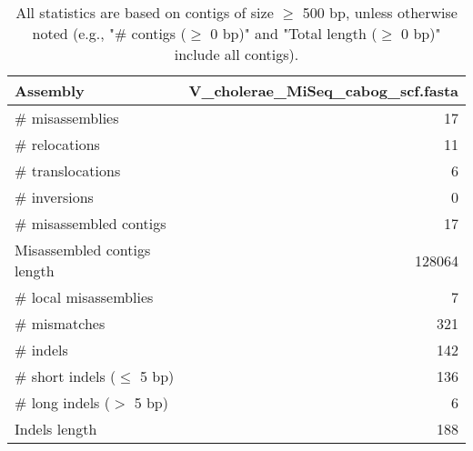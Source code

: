 \documentclass[12pt,a4paper]{article}
\begin{document}
\begin{table}[ht]
\begin{center}
\caption{All statistics are based on contigs of size $\geq$ 500 bp, unless otherwise noted (e.g., "\# contigs ($\geq$ 0 bp)" and "Total length ($\geq$ 0 bp)" include all contigs).}
\begin{tabular}{|l*{1}{|r}|}
\hline
Assembly & V\_cholerae\_MiSeq\_cabog\_scf.fasta \\ \hline
\# misassemblies & 17 \\ \hline
\hspace{5mm}\# relocations & 11 \\ \hline
\hspace{5mm}\# translocations & 6 \\ \hline
\hspace{5mm}\# inversions & 0 \\ \hline
\# misassembled contigs & 17 \\ \hline
Misassembled contigs length & 128064 \\ \hline
\# local misassemblies & 7 \\ \hline
\# mismatches & 321 \\ \hline
\# indels & 142 \\ \hline
\hspace{5mm}\# short indels ($\leq$ 5 bp) & 136 \\ \hline
\hspace{5mm}\# long indels ($>$ 5 bp) & 6 \\ \hline
Indels length & 188 \\ \hline
\end{tabular}
\end{center}
\end{table}
\end{document}
